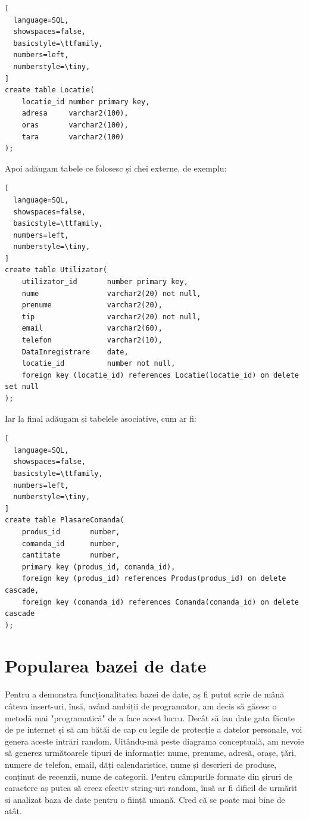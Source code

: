 \documentclass[12pt]{article}
\begin{document}
\begin{lstlisting}[
  language=SQL,
  showspaces=false,
  basicstyle=\ttfamily,
  numbers=left,
  numberstyle=\tiny,
]
create table Locatie(
	locatie_id number primary key,
	adresa     varchar2(100),
	oras       varchar2(100),
	tara	   varchar2(100)
);
\end{lstlisting}

\vspace{0.5em}

Apoi adăugam tabele ce folosesc și chei externe, de exemplu:

\begin{lstlisting}[
  language=SQL,
  showspaces=false,
  basicstyle=\ttfamily,
  numbers=left,
  numberstyle=\tiny,
]
create table Utilizator(
	utilizator_id		number primary key,
	nume				varchar2(20) not null,
	prenume				varchar2(20),
	tip 				varchar2(20) not null,
	email				varchar2(60),
	telefon				varchar2(10),
	DataInregistrare	date,
	locatie_id			number not null,
	foreign key (locatie_id) references Locatie(locatie_id) on delete set null
);
\end{lstlisting}

\vspace{0.5em}

Iar la final adăugam și tabelele asociative, cum ar fi:

\vspace{0.5em}

\begin{lstlisting}[
  language=SQL,
  showspaces=false,
  basicstyle=\ttfamily,
  numbers=left,
  numberstyle=\tiny,
]
create table PlasareComanda(
	produs_id		number,
	comanda_id		number,
	cantitate		number,
	primary key (produs_id, comanda_id),
	foreign key (produs_id) references Produs(produs_id) on delete cascade,
	foreign key (comanda_id) references Comanda(comanda_id) on delete cascade
);
\end{lstlisting}

\pagebreak

\section{Popularea bazei de date}
Pentru a demonstra funcționalitatea bazei de date, aș fi putut scrie de mână câteva insert-uri, însă,
având ambiții de programator, am decis să găsesc o metodă mai "programatică" de a face acest lucru. Decât să 
iau date gata făcute de pe internet și să am bătăi de cap cu legile de protecție a datelor personale, voi
genera aceste intrări random. Uitându-mă peste diagrama conceptuală, am nevoie să generez următoarele tipuri
de informație: nume, prenume, adresă, orașe, țări, numere de telefon, email, dăți calendaristice, nume și descrieri
de produse, conținut de recenzii, nume de categorii. Pentru câmpurile formate din șiruri de caractere aș putea să creez efectiv
string-uri random, însă ar fi dificil de urmărit si analizat baza de date pentru o ființă umană. Cred că se 
poate mai bine de atât.
\end{document}
